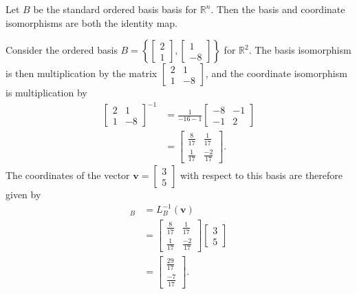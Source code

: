 \documentclass[12pt,letterpaper,reqno]{article}
\numberwithin{equation}{section}
\newcommand{\R}{\ensuremath{\mathbb R}}
\begin{document}
\begin{example}
Let $B$ be the standard ordered basis basis for $\R^n$. Then the basis and coordinate isomorphisms are both the identity map.
\end{example}


\begin{example}
Consider the ordered basis $B=\left\{\begin{bmatrix}
	2 \\1 
\end{bmatrix}, \begin{bmatrix}
	1 \\ -8
\end{bmatrix}\right\}$ for $\R^2$. The basis isomorphism is then multiplication by the matrix $\begin{bmatrix}
	2 & 1 \\
	1 & -8
\end{bmatrix}$, and the coordinate isomorphism is multiplication by
\begin{align*}
	\begin{bmatrix}
	2 & 1 \\
	1 & -8
\end{bmatrix}^{-1}&=\frac{1}{-16-1}\begin{bmatrix}
	-8 & -1 \\
	-1 & 2
\end{bmatrix} \\
&=\begin{bmatrix}
	\frac{8}{17}&\frac{1}{17} \\
	\frac{1}{17}&\frac{-2}{17}
\end{bmatrix}.
\end{align*}
The coordinates of the vector $\mathbf{v}=\begin{bmatrix}
	3 \\ 5
\end{bmatrix}$ with respect to this basis are therefore given by
\begin{align*}
	[\mathbf{v}]_B&=L_B^{-1}(\mathbf{v}) \\
	&=\begin{bmatrix}
	\frac{8}{17}&\frac{1}{17} \\
	\frac{1}{17}&\frac{-2}{17}
\end{bmatrix}\begin{bmatrix}
	3 \\ 5
\end{bmatrix} \\
&=\begin{bmatrix}
	\frac{29}{17} \\ \frac{-7}{17}
\end{bmatrix}.
\end{align*}
\end{example}
\end{document}
